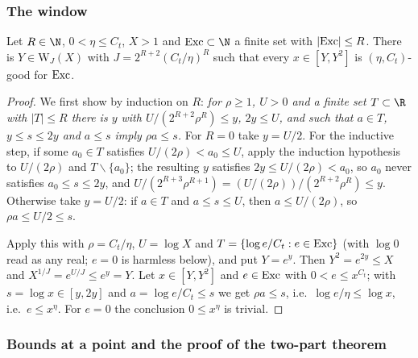 \subsubsection{The window}

\begin{lemma}\label{pf:vwin:window}
Let $R\in\N$, $0<\eta\le C_t$, $X>1$ and $\vwinexc\subset\N$ a finite set with $|\mathrm{Exc}|\le R$. There is
$Y\in\mathrm{W}_J(X)$ with $J=2^{R+2}(C_t/\eta)^R$ such that every $x\in[Y,Y^2]$ is $(\eta,C_t)$-good for $\mathrm{Exc}$.
\end{lemma}

\begin{proof}
We first show by induction on $R$: \emph{for $\rho\ge1$, $U>0$ and a finite set $T\subset\R$ with $|T|\le R$ there is $y$ with
$U/(2^{R+2}\rho^R)\le y$, $2y\le U$, and such that $a\in T$, $y\le s\le2y$ and $a\le s$ imply $\rho a\le s$.} For $R=0$ take
$y=U/2$. For the inductive step, if some $a_0\in T$ satisfies $U/(2\rho)<a_0\le U$, apply the induction hypothesis to
$U/(2\rho)$ and $T\smallsetminus\{a_0\}$; the resulting $y$ satisfies $2y\le U/(2\rho)<a_0$, so $a_0$ never satisfies $a_0\le s\le2y$,
and $U/(2^{R+3}\rho^{R+1})=(U/(2\rho))/(2^{R+2}\rho^R)\le y$. Otherwise take $y=U/2$: if $a\in T$ and $a\le s\le U$, then
$a\le U/(2\rho)$, so $\rho a\le U/2\le s$.

Apply this with $\rho=C_t/\eta$, $U=\log X$ and $T=\{\log e/C_t:e\in\mathrm{Exc}\}$ (with $\log 0$ read as any real; $e=0$ is harmless
below), and put $Y=e^y$. Then $Y^2=e^{2y}\le X$ and $X^{1/J}=e^{U/J}\le e^y=Y$. Let $x\in[Y,Y^2]$ and $e\in\mathrm{Exc}$ with
$0<e\le x^{C_t}$; with $s=\log x\in[y,2y]$ and $a=\log e/C_t\le s$ we get $\rho a\le s$, i.e.\ $\log e/\eta\le\log x$, i.e.\
$e\le x^\eta$. For $e=0$ the conclusion $0\le x^\eta$ is trivial.
\end{proof}

\subsubsection{Bounds at a point and the proof of the two-part theorem}

